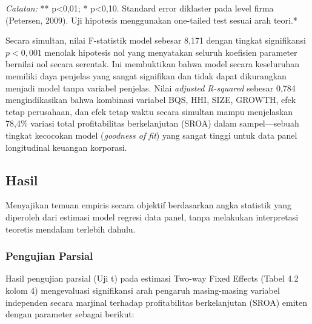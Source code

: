 \documentclass[12pt,a4paper]{article}
\begin{document}
\emph{Catatan: }** p\textless0,01; * p\textless0,10. Standard error
diklaster pada level firma (Petersen, 2009). Uji hipotesis menggunakan
one-tailed test sesuai arah teori.*

Secara simultan, nilai F-statistik model sebesar 8,171 dengan tingkat
signifikansi \(p < 0{,}001\) menolak hipotesis nol yang menyatakan
seluruh koefisien parameter bernilai nol secara serentak. Ini
membuktikan bahwa model secara keseluruhan memiliki daya penjelas yang
sangat signifikan dan tidak dapat dikurangkan menjadi model tanpa
variabel penjelas. Nilai \emph{adjusted R-squared} sebesar 0,784
mengindikasikan bahwa kombinasi variabel BQS, HHI, SIZE, GROWTH, efek
tetap perusahaan, dan efek tetap waktu secara simultan mampu menjelaskan
78,4\% variasi total profitabilitas berkelanjutan (SROA) dalam
sampel---sebuah tingkat kecocokan model (\emph{goodness of fit}) yang
sangat tinggi untuk data panel longitudinal keuangan korporasi.

\subsection{Hasil}\label{hasil}

Menyajikan temuan empiris secara objektif berdasarkan angka statistik
yang diperoleh dari estimasi model regresi data panel, tanpa melakukan
interpretasi teoretis mendalam terlebih dahulu.

\subsubsection{Pengujian Parsial}\label{pengujian-parsial}

Hasil pengujian parsial (Uji t) pada estimasi Two-way Fixed Effects
(Tabel 4.2 kolom 4) mengevaluasi signifikansi arah pengaruh
masing-masing variabel independen secara marjinal terhadap
profitabilitas berkelanjutan (SROA) emiten dengan parameter sebagai
berikut:
\end{document}

